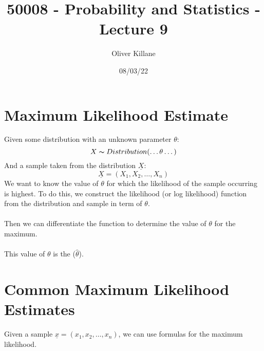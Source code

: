 \documentclass{report}
\title{50008 - Probability and Statistics - Lecture 9}
\author{Oliver Killane}
\date{08/03/22}
\begin{document}
    \maketitle
    \section*{Maximum Likelihood Estimate}
        Given some distribution with an unknown parameter $\theta$:
        \[X \thicksim Distribution(\dots \theta \dots)\]
        And a sample taken from the distribution $\underline{X}$:
        \[\underline{X} = (X_1, X_2, \dots, X_n)\]
        We want to know the value of $\theta$ for which the likelihood of the sample occurring is highest.
        To do this, we construct the likelihood (or log likelihood) function from the distribution and sample in term of $\theta$.
        \\
        \\ Then we can differentiate the function to determine the value of $\theta$ for the maximum.
        \\
        \\ This value of $\theta$ is the  ($\hat{\theta}$).
    
    \section*{Common Maximum Likelihood Estimates}
        Given a sample $\underline{x} = (x_1, x_2, \dots, x_n)$, we can use formulas for the maximum likelihood.
        
\end{document}
